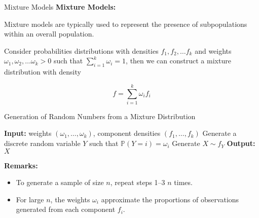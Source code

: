 \documentclass[8pt]{beamer}
\begin{document}
\begin{frame}{Mixture Models}
\textbf{Mixture Models:}

\vspace{2mm}

Mixture models are typically used to represent the presence of subpopulations within an overall population. 
\vspace{2mm}

Consider probabilities distributions with densities $f_1,f_2, \ldots f_k$ and weights $\omega_1, \omega_2, \ldots \omega_k >  0$ such that 
$\displaystyle{\sum_{i=1}^k \omega_i =1}$, then we can construct a mixture distribution with density

$$f=\sum_{i=1}^k \omega_i f_i$$
\end{frame}

\begin{frame}{Generation of Random Numbers from a Mixture Distribution}
\begin{algorithm}[H]
\caption{Simulation from a Mixture Distribution}\label{alg:mixture}
\begin{algorithmic}[1]
  \State \textbf{Input:} weights $(\omega_1, \dots, \omega_k)$, component densities $(f_1, \dots, f_k)$
  \State Generate a discrete random variable $Y$ such that 
        $\mathbb{P}(Y=i) = \omega_i$
  \State Generate $X \sim f_Y$
  \State \textbf{Output:} $X$
\end{algorithmic}
\end{algorithm}

\vspace{2mm}

\textbf{Remarks:}  
\begin{itemize}
  \item To generate a sample of size $n$, repeat steps 1–3 $n$ times.  
  \item For large $n$, the weights $\omega_i$ approximate the proportions of observations generated from each component $f_i$.  
\end{itemize}
\end{frame}
\end{document}
